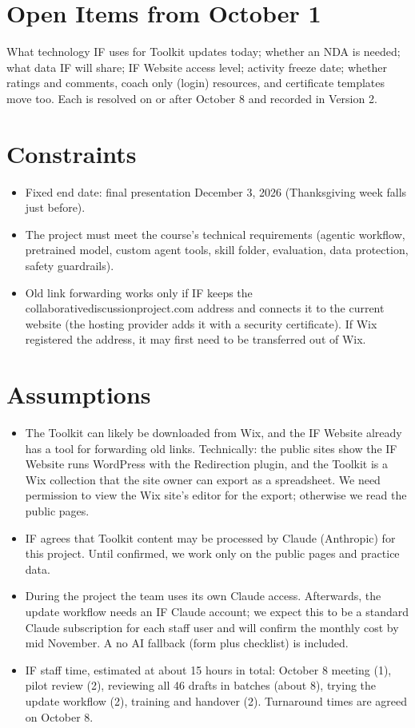 \section{Open Items from October 1}
What technology IF uses for Toolkit updates today; whether an NDA is needed; what data IF will share; IF Website access level; activity freeze date; whether ratings and comments, coach only (login) resources, and certificate templates move too. Each is resolved on or after October 8 and recorded in Version 2.

\section{Constraints}
\begin{itemize}
  \item Fixed end date: final presentation December 3, 2026 (Thanksgiving week falls just before).
  \item The project must meet the course's technical requirements (agentic workflow, pretrained model, custom agent tools, skill folder, evaluation, data protection, safety guardrails).
  \item Old link forwarding works only if IF keeps the collaborativediscussionproject.com address and connects it to the current website (the hosting provider adds it with a security certificate). If Wix registered the address, it may first need to be transferred out of Wix.
\end{itemize}

\section{Assumptions}
\begin{itemize}
  \item The Toolkit can likely be downloaded from Wix, and the IF Website already has a tool for forwarding old links. Technically: the public sites show the IF Website runs WordPress with the Redirection plugin, and the Toolkit is a Wix collection that the site owner can export as a spreadsheet. We need permission to view the Wix site's editor for the export; otherwise we read the public pages.
  \item IF agrees that Toolkit content may be processed by Claude (Anthropic) for this project. Until confirmed, we work only on the public pages and practice data.
  \item During the project the team uses its own Claude access. Afterwards, the update workflow needs an IF Claude account; we expect this to be a standard Claude subscription for each staff user and will confirm the monthly cost by mid November. A no AI fallback (form plus checklist) is included.
  \item IF staff time, estimated at about 15 hours in total: October 8 meeting (1), pilot review (2), reviewing all 46 drafts in batches (about 8), trying the update workflow (2), training and handover (2). Turnaround times are agreed on October 8.
\end{itemize}

